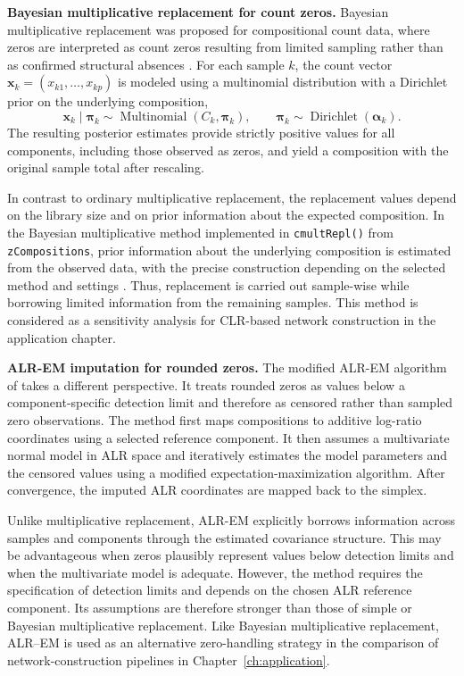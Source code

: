 \noindent\textbf{Bayesian multiplicative replacement for count zeros.}
Bayesian multiplicative replacement was proposed for compositional count data, where zeros are interpreted as count zeros resulting from limited sampling rather than as confirmed structural absences \citep{martin-fernandez2015bayesianmultiplicative}. For each sample $k$, the count vector $\boldsymbol{x}_k=(x_{k1},\ldots,x_{kp})$ is modeled using a multinomial distribution with a Dirichlet prior on the underlying composition,
\begin{equation}
\boldsymbol{x}_k \mid \boldsymbol{\pi}_k
\sim
\operatorname{Multinomial}(C_k,\boldsymbol{\pi}_k),
\qquad
\boldsymbol{\pi}_k
\sim
\operatorname{Dirichlet}(\boldsymbol{\alpha}_k).
\label{eq:2micro:bayesian_multiplicative_model}
\end{equation}
The resulting posterior estimates provide strictly positive values for all components, including those observed as zeros, and yield a composition with the original sample total after rescaling.

In contrast to ordinary multiplicative replacement, the replacement values depend on the library size and on prior information about the expected composition. In the Bayesian multiplicative method implemented in \texttt{cmultRepl()} from \texttt{zCompositions}, prior information about the underlying composition is estimated from the observed data, with the precise construction depending on the selected method and settings \citep{martin-fernandez2015bayesianmultiplicative,palarea-albaladejo2015zcompositions}. Thus, replacement is carried out sample-wise while borrowing limited information from the remaining samples. This method is considered as a sensitivity analysis for CLR-based network construction in the application chapter.

\noindent\textbf{ALR-EM imputation for rounded zeros.}
The modified ALR-EM algorithm of \citet{palarea-albaladejo2008modified} takes a different perspective. It treats rounded zeros as values below a component-specific detection limit and therefore as censored rather than sampled zero observations. The method first maps compositions to additive log-ratio coordinates using a selected reference component. It then assumes a multivariate normal model in ALR space and iteratively estimates the model parameters and the censored values using a modified expectation-maximization algorithm. After convergence, the imputed ALR coordinates are mapped back to the simplex.

Unlike multiplicative replacement, ALR-EM explicitly borrows information across samples and components through the estimated covariance structure. This may be advantageous when zeros plausibly represent values below detection limits and when the multivariate model is adequate. However, the method requires the specification of detection limits and depends on the chosen ALR reference component. Its assumptions are therefore stronger than those of simple or Bayesian multiplicative replacement. Like Bayesian multiplicative replacement, ALR--EM is used as an alternative zero-handling strategy in the comparison of network-construction pipelines in Chapter~\ref{ch:application}.


